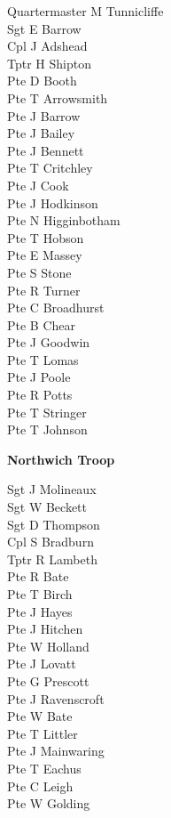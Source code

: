 \begin{multicols}{2}
  \noindent
  Quartermaster M Tunnicliffe \\
  Sgt E Barrow \\
  Cpl J Adshead \\
  Tptr H Shipton \\
  Pte D Booth \\
  Pte T Arrowsmith \\
  Pte J Barrow \\
  Pte J Bailey \\
  Pte J Bennett \\
  Pte T Critchley \\
  Pte J Cook \\
  Pte J Hodkinson \\
  Pte N Higginbotham \\
  Pte T Hobson \\
  Pte E Massey \\
  Pte S Stone \\
  Pte R Turner \\
  Pte C Broadhurst \\
  Pte B Chear \\
  Pte J Goodwin \\
  Pte T Lomas \\
  Pte J Poole \\
  Pte R Potts \\
  Pte T Stringer \\
  Pte T Johnson \\
\end{multicols}

\begin{center}
  \Large
  \textbf{Northwich Troop}
\end{center}

\begin{multicols}{2}
  \noindent
  Sgt J Molineaux \\
  Sgt W Beckett \\
  Sgt D Thompson \\
  Cpl S Bradburn \\
  Tptr R Lambeth \\
  Pte R Bate \\
  Pte T Birch \\
  Pte J Hayes \\
  Pte J Hitchen \\
  Pte W Holland \\
  Pte J Lovatt \\
  Pte G Prescott \\
  Pte J Ravenscroft \\
  Pte W Bate \\
  Pte T Littler \\
  Pte J Mainwaring \\
  Pte T Eachus \\
  Pte C Leigh \\
  Pte W Golding \\
\end{multicols}
